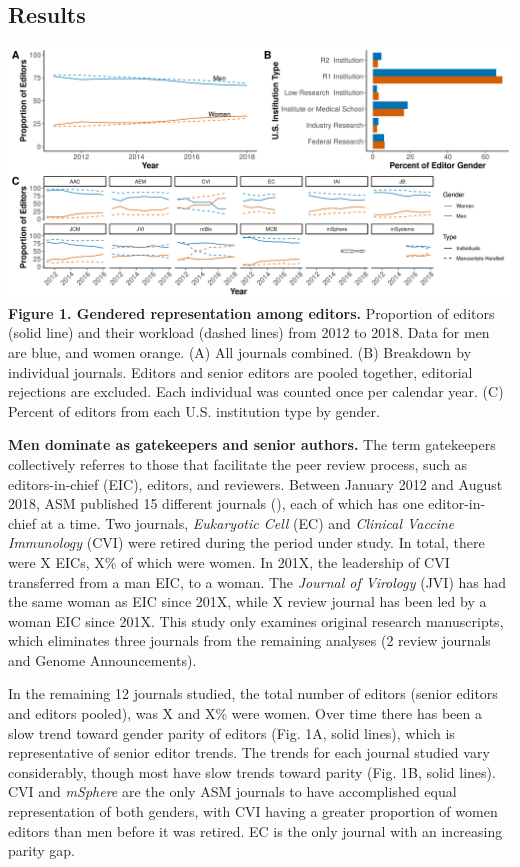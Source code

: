 \documentclass[11pt,]{article}
\begin{document}
\subsection{Results}\label{results}

\includegraphics{Figure_1.png} \textbf{Figure 1. Gendered representation
among editors.} Proportion of editors (solid line) and their workload
(dashed lines) from 2012 to 2018. Data for men are blue, and women
orange. (A) All journals combined. (B) Breakdown by individual journals.
Editors and senior editors are pooled together, editorial rejections are
excluded. Each individual was counted once per calendar year. (C)
Percent of editors from each U.S. institution type by gender.

\textbf{Men dominate as gatekeepers and senior authors.} The term
gatekeepers collectively referres to those that facilitate the peer
review process, such as editors-in-chief (EIC), editors, and reviewers.
Between January 2012 and August 2018, ASM published 15 different
journals (), each of which has one editor-in-chief at a time. Two
journals, \emph{Eukaryotic Cell} (EC) and \emph{Clinical Vaccine
Immunology} (CVI) were retired during the period under study. In total,
there were X EICs, X\% of which were women. In 201X, the leadership of
CVI transferred from a man EIC, to a woman. The \emph{Journal of
Virology} (JVI) has had the same woman as EIC since 201X, while X review
journal has been led by a woman EIC since 201X. This study only examines
original research manuscripts, which eliminates three journals from the
remaining analyses (2 review journals and Genome Announcements).

In the remaining 12 journals studied, the total number of editors
(senior editors and editors pooled), was X and X\% were women. Over time
there has been a slow trend toward gender parity of editors (Fig. 1A,
solid lines), which is representative of senior editor trends. The
trends for each journal studied vary considerably, though most have slow
trends toward parity (Fig. 1B, solid lines). CVI and \emph{mSphere} are
the only ASM journals to have accomplished equal representation of both
genders, with CVI having a greater proportion of women editors than men
before it was retired. EC is the only journal with an increasing parity
gap.
\end{document}
